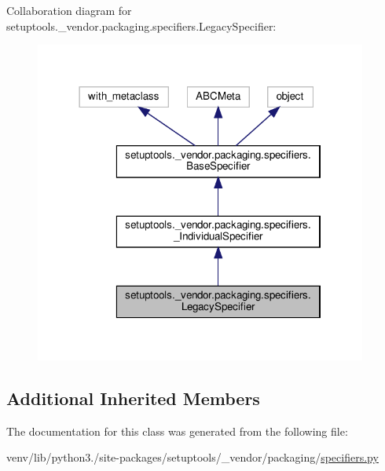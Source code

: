 Collaboration diagram for setuptools.\+\_\+vendor.\+packaging.\+specifiers.\+Legacy\+Specifier\+:
\nopagebreak
\begin{figure}[H]
\begin{center}
\leavevmode
\includegraphics[width=310pt]{classsetuptools_1_1__vendor_1_1packaging_1_1specifiers_1_1LegacySpecifier__coll__graph}
\end{center}
\end{figure}
\subsection*{Additional Inherited Members}


The documentation for this class was generated from the following file\+:\begin{DoxyCompactItemize}
\item 
venv/lib/python3./site-\/packages/setuptools/\+\_\+vendor/packaging/\hyperlink{setuptools_2__vendor_2packaging_2specifiers_8py}{specifiers.\+py}\end{DoxyCompactItemize}

